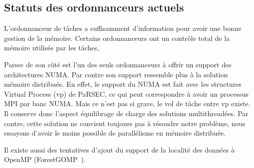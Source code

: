\subsection{Statuts des ordonnanceurs actuels}
L'ordonnanceur de tâches a suffisamment d'information pour avoir une bonne gestion de la mémoire.
%
Certains ordonnanceurs ont un contrôle total de la mémoire utilisée par les tâches,




Parsec de son côté est l'un des seuls ordonnanceurs à offrir un support des architectures NUMA.
%
Par contre son support ressemble plus à la solution mémoire distribuée.
%
En effet, le support du NUMA est fait avec les structures Virtual Process (vp) de PaRSEC, ce qui peut correspondre à avoir un processus MPI par banc NUMA.
%
Mais ce n'est pas si grave, le vol de tâche entre vp existe.
%
Il conserve donc l'aspect équilibrage de charge des solutions multithreadées.
%
Par contre, cette solution ne convient toujours pas à résoudre notre problème, nous essayons d'avoir le moins possible de parallélisme en mémoire distribuée.


Il existe aussi des tentatives d'ajout du support de la localité des données à OpenMP (ForestGOMP~\cite{Bro10Thesis}).
